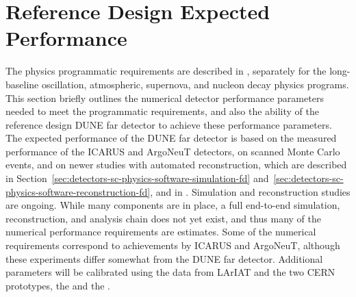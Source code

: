 
\section{Reference Design Expected Performance}
\label{sec:detectors-fd-ref-perf}

The physics programmatic requirements are described in \volphys,
separately for the long-baseline oscillation, atmospheric, supernova,
and nucleon decay physics programs.  This section briefly outlines the
numerical detector performance parameters needed to meet the
programmatic requirements, and also the ability of the reference
design DUNE far detector to achieve these performance parameters.  The
expected performance of the DUNE far detector is based on the measured
performance of the ICARUS\cite{Amerio:2004ze} and
ArgoNeuT\cite{Anderson:2012vc} detectors, on scanned Monte Carlo
events\cite{docdb-6954}, and on newer studies with automated
reconstruction, which are described in
Section~\ref{sec:detectors-sc-physics-software-simulation-fd}
and~\ref{sec:detectors-sc-physics-software-reconstruction-fd}, and in
\anxreco.  Simulation and reconstruction studies are ongoing.  While
many components are in place, a full end-to-end simulation,
reconstruction, and analysis chain does not yet exist, and thus many
of the numerical performance requirements are estimates.  Some of the
numerical requirements correspond to achievements by ICARUS and
ArgoNeuT, although these experiments differ somewhat from the DUNE far
detector.  Additional parameters will be calibrated using the data
from LArIAT and the two CERN prototypes, the \cernsingleproto{} and
the \cerndualproto.

